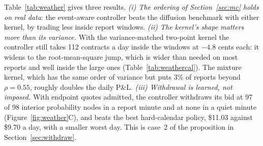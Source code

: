 \documentclass[11pt]{article}
\newcommand{\1}{\mathbf 1}
\begin{document}
\begin{table}[htbp]
\centering\small
{}
\caption{Out-of-sample replay, April--September 2026, 182 days, 10-contract
quotes. $t$ is the mean daily P\&L over its standard error. ``Window fills'' are
contracts filled inside the hourly-report windows. The hard calendar withdraws all
quotes for three minutes from each report minute and 150 seconds from each summary
message.}
\label{tab:weather}
\end{table}

Table~\ref{tab:weather} gives three results.
\emph{(i) The ordering of Section~\ref{sec:mc} holds on real data}: the event-aware
controller beats the diffusion benchmark with either kernel, by trading less
inside report windows.
\emph{(ii) The kernel's shape matters more than its variance.} With the
variance-matched two-point kernel the controller still takes 112 contracts a
day inside the windows at $-4.8$ cents each: it widens to the root-mean-square
jump, which is wider than needed on most reports and well inside the large ones
(Table~\ref{tab:weathercal}). The mixture kernel, which has the same order of variance but
puts 3\% of reports beyond $\rho=0.55$, roughly doubles the daily P\&L.
\emph{(iii) Withdrawal is learned, not imposed.} With endpoint quotes admitted,
the controller withdraws its bid at 97 of 98 interior probability nodes in a
report minute and at none in a quiet minute (Figure~\ref{fig:weather}C), and
beats the best hard-calendar policy, \$11.03 against \$9.70 a day, with a
smaller worst day. This is case~2 of the proposition in Section~\ref{sec:withdraw}.
\end{document}
